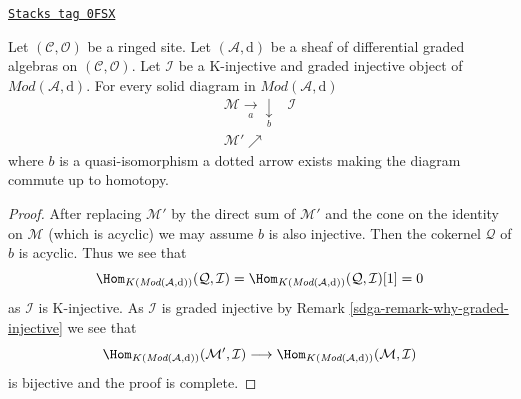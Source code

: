 \begin{lemma}
\label{sdga-lemma-second-property-dg-injective}
\href{https://stacks.math.columbia.edu/tag/0FSX}{\texttt{Stacks tag 0FSX}}

Let $(\mathcal{C}, \mathcal{O})$ be a ringed site. Let
$(\mathcal{A}, \text{d})$ be a sheaf of differential graded algebras on
$(\mathcal{C}, \mathcal{O})$. Let $\mathcal{I}$ be a
K-injective and graded injective
object of $\textit{Mod}(\mathcal{A}, \text{d})$.
For every solid diagram in $\textit{Mod}(\mathcal{A}, \text{d})$
$$
\begin{array}{cc}\mathcal{M} \underset{a}{\longrightarrow}\underset{b}{\downarrow} & \mathcal{I} \\ \mathcal{M}' \nearrow & \end{array}
$$
where $b$ is a quasi-isomorphism a dotted arrow exists making the
diagram commute up to homotopy.
\end{lemma}

\begin{proof}

After replacing $\mathcal{M}'$ by the direct sum of $\mathcal{M}'$
and the cone on the identity on $\mathcal{M}$ (which is acyclic)
we may assume $b$ is also injective. Then the cokernel $\mathcal{Q}$
of $b$ is acyclic. Thus we see that
$$
\Hom_{K(\textit{Mod}(\mathcal{A}, \text{d}))}(\mathcal{Q}, \mathcal{I}) =
\Hom_{K(\textit{Mod}(\mathcal{A}, \text{d}))}(\mathcal{Q}, \mathcal{I})[1] = 0
$$
as $\mathcal{I}$ is K-injective. As $\mathcal{I}$ is graded injective
by Remark \ref{sdga-remark-why-graded-injective}
we see that
$$
\Hom_{K(\textit{Mod}(\mathcal{A}, \text{d}))}(\mathcal{M}', \mathcal{I})
\longrightarrow
\Hom_{K(\textit{Mod}(\mathcal{A}, \text{d}))}(\mathcal{M}, \mathcal{I})
$$
is bijective and the proof is complete.
\end{proof}

